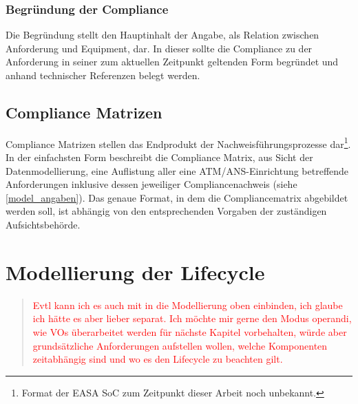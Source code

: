 \subsubsection{Begründung der Compliance}

Die Begründung stellt den Hauptinhalt der Angabe, als Relation zwischen Anforderung und Equipment, dar. 
In dieser sollte die Compliance zu der Anforderung in seiner zum aktuellen Zeitpunkt geltenden Form begründet und anhand technischer Referenzen belegt werden.




\subsection{Compliance Matrizen}

Compliance Matrizen stellen das Endprodukt der Nachweisführungsprozesse dar\footnote{Format der EASA SoC zum Zeitpunkt dieser Arbeit noch unbekannt.}.
In der einfachsten Form beschreibt die Compliance Matrix, aus Sicht der Datenmodellierung, eine Auflistung aller eine ATM/ANS-Einrichtung betreffende Anforderungen inklusive dessen jeweiliger Compliancenachweis (siehe \ref{model_angaben}).
Das genaue Format, in dem die Compliancematrix abgebildet werden soll, ist abhängig von den entsprechenden Vorgaben der zuständigen Aufsichtsbehörde.


\pagebreak



\section{Modellierung der Lifecycle}

\begin{quote}
\textcolor{red}{Evtl kann ich es auch mit in die Modellierung oben einbinden, ich glaube ich hätte es aber lieber separat.  Ich möchte mir gerne den Modus operandi, wie VOs überarbeitet werden für nächste Kapitel vorbehalten, würde aber grundsätzliche Anforderungen aufstellen wollen, welche Komponenten zeitabhängig sind und wo es den Lifecycle zu beachten gilt.}
\end{quote}

